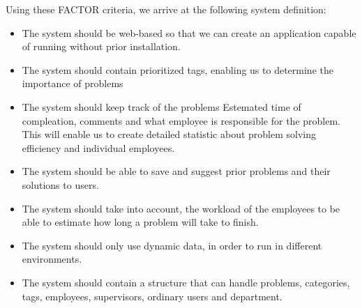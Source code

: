 Using these FACTOR criteria, we arrive at the following system definition:
\begin{itemize}
\item The system should be web-based so that we can create an application capable of running without prior installation.
\item The system should contain prioritized tags, enabling us to determine the importance of problems
\item The system should keep track of the problems Estemated time of compleation, comments and what employee is responsible for the problem. This will enable us to create detailed statistic about problem solving efficiency and individual employees.
\item The system should be able to save and suggest prior problems and their solutions to users.
\item The system should take into account, the workload of the employees to be able to estimate how long a problem will take to finish.
\item The system should only use dynamic data, in order to run in different environments.
\item The system should contain a structure that can handle problems, categories, tags, employees, supervisors, ordinary users and department.
\end{itemize}

